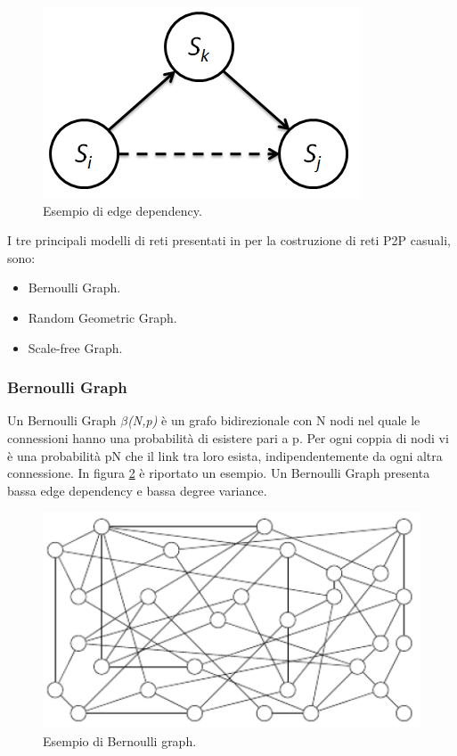 \begin{figure}[h]
	\centering
	\includegraphics[width=0.4\linewidth,keepaspectratio]{Images/reti/edge_dependency_02}
	\caption[Edge dependency]{Esempio di edge dependency.}
	\label{fig:edge_dependency_02}
\end{figure}

I tre principali modelli di reti presentati in \cite{comparisonGAonRT2012} per la costruzione di reti \acs{P2P} casuali, sono:
\begin{itemize}
	\item Bernoulli Graph.
	\item Random Geometric Graph.
	\item Scale-free Graph.
\end{itemize}
\bigskip

\subsubsection{Bernoulli Graph}
Un Bernoulli Graph \textit{$\beta$(N,p)} è un grafo bidirezionale con N nodi nel quale le connessioni hanno una probabilità di esistere pari a p. Per ogni coppia di nodi vi è una probabilità pN che il link tra loro esista, indipendentemente da ogni altra connessione. In figura \ref{fig:bernoulli_graph} è riportato un esempio. Un Bernoulli Graph presenta bassa edge dependency e bassa degree variance.
\bigskip
\begin{figure}[h]
	\centering
	\includegraphics[width=0.7\linewidth,keepaspectratio]{Images/reti/bernoulli_graph}
	\caption[Bernoulli graph]{Esempio di Bernoulli graph.}
	\label{fig:bernoulli_graph}
\end{figure}
\bigskip

